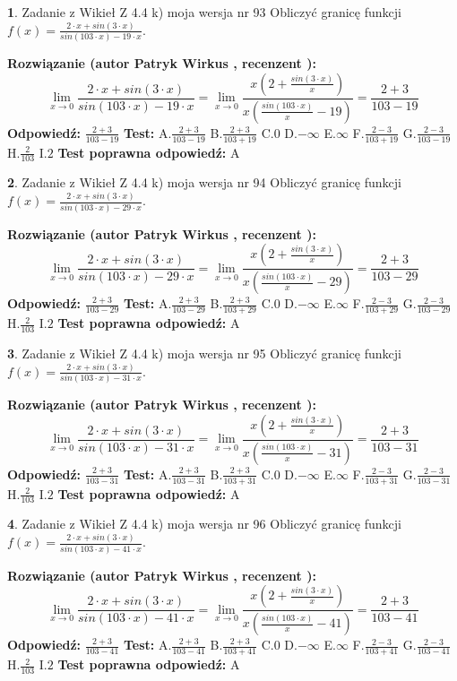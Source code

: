 \documentclass[12pt, a4paper]{article}
\theoremstyle{definition} %
\newtheorem{zad}{}
\newcommand{\zadStart}[1]{\begin{zad}#1\newline}
\newcommand{\zadStop}{\end{zad}}
\newcommand{\rozwStart}[2]{\noindent \textbf{Rozwiązanie (autor #1 , recenzent #2): }\newline}
\newcommand{\rozwStop}{\newline}
\newcommand{\odpStart}{\noindent \textbf{Odpowiedź:}\newline}
\newcommand{\odpStop}{\newline}
\newcommand{\testStart}{\noindent \textbf{Test:}\newline}
\newcommand{\testStop}{\newline}
\newcommand{\kluczStart}{\noindent \textbf{Test poprawna odpowiedź:}\newline}
\newcommand{\kluczStop}{\newline}
\begin{document}
\zadStart{Zadanie z Wikieł Z 4.4 k) moja wersja nr 93}
Obliczyć granicę funkcji $f(x)=\frac{2\cdot x +sin(3\cdot x)}{sin(103\cdot x) -19\cdot x}$.
\zadStop
\rozwStart{Patryk Wirkus}{}
$$\lim\limits_{x\to 0}\frac{2\cdot x +sin(3\cdot x)}{sin(103\cdot x) -19\cdot x}
=\lim\limits_{x\to 0}\frac{x(2+\frac{sin(3\cdot x)}{x})}{x(\frac{sin(103\cdot x)}{x}-19)}
=\frac{2+3}{103-19}$$
\rozwStop
\odpStart
$\frac{2+3}{103-19}$
\odpStop
\testStart
A.$\frac{2+3}{103-19}$
B.$\frac{2+3}{103+19}$
C.$0$
D.$-\infty$
E.$\infty$
F.$\frac{2-3}{103+19}$
G.$\frac{2-3}{103-19}$
H.$\frac{2}{103}$
I.$2$
\testStop
\kluczStart
A
\kluczStop



\zadStart{Zadanie z Wikieł Z 4.4 k) moja wersja nr 94}
Obliczyć granicę funkcji $f(x)=\frac{2\cdot x +sin(3\cdot x)}{sin(103\cdot x) -29\cdot x}$.
\zadStop
\rozwStart{Patryk Wirkus}{}
$$\lim\limits_{x\to 0}\frac{2\cdot x +sin(3\cdot x)}{sin(103\cdot x) -29\cdot x}
=\lim\limits_{x\to 0}\frac{x(2+\frac{sin(3\cdot x)}{x})}{x(\frac{sin(103\cdot x)}{x}-29)}
=\frac{2+3}{103-29}$$
\rozwStop
\odpStart
$\frac{2+3}{103-29}$
\odpStop
\testStart
A.$\frac{2+3}{103-29}$
B.$\frac{2+3}{103+29}$
C.$0$
D.$-\infty$
E.$\infty$
F.$\frac{2-3}{103+29}$
G.$\frac{2-3}{103-29}$
H.$\frac{2}{103}$
I.$2$
\testStop
\kluczStart
A
\kluczStop



\zadStart{Zadanie z Wikieł Z 4.4 k) moja wersja nr 95}
Obliczyć granicę funkcji $f(x)=\frac{2\cdot x +sin(3\cdot x)}{sin(103\cdot x) -31\cdot x}$.
\zadStop
\rozwStart{Patryk Wirkus}{}
$$\lim\limits_{x\to 0}\frac{2\cdot x +sin(3\cdot x)}{sin(103\cdot x) -31\cdot x}
=\lim\limits_{x\to 0}\frac{x(2+\frac{sin(3\cdot x)}{x})}{x(\frac{sin(103\cdot x)}{x}-31)}
=\frac{2+3}{103-31}$$
\rozwStop
\odpStart
$\frac{2+3}{103-31}$
\odpStop
\testStart
A.$\frac{2+3}{103-31}$
B.$\frac{2+3}{103+31}$
C.$0$
D.$-\infty$
E.$\infty$
F.$\frac{2-3}{103+31}$
G.$\frac{2-3}{103-31}$
H.$\frac{2}{103}$
I.$2$
\testStop
\kluczStart
A
\kluczStop



\zadStart{Zadanie z Wikieł Z 4.4 k) moja wersja nr 96}
Obliczyć granicę funkcji $f(x)=\frac{2\cdot x +sin(3\cdot x)}{sin(103\cdot x) -41\cdot x}$.
\zadStop
\rozwStart{Patryk Wirkus}{}
$$\lim\limits_{x\to 0}\frac{2\cdot x +sin(3\cdot x)}{sin(103\cdot x) -41\cdot x}
=\lim\limits_{x\to 0}\frac{x(2+\frac{sin(3\cdot x)}{x})}{x(\frac{sin(103\cdot x)}{x}-41)}
=\frac{2+3}{103-41}$$
\rozwStop
\odpStart
$\frac{2+3}{103-41}$
\odpStop
\testStart
A.$\frac{2+3}{103-41}$
B.$\frac{2+3}{103+41}$
C.$0$
D.$-\infty$
E.$\infty$
F.$\frac{2-3}{103+41}$
G.$\frac{2-3}{103-41}$
H.$\frac{2}{103}$
I.$2$
\testStop
\kluczStart
A
\kluczStop
\end{document}
